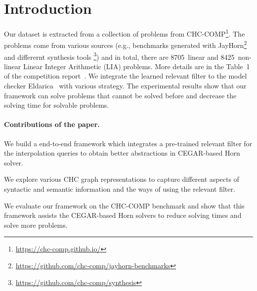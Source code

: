 
% 


\section{Introduction}




Our dataset is extracted from a collection of problems from CHC-COMP\footnote{\url{https://chc-comp.github.io/}}. The problems come from various sources (e.g., benchmarks generated with JayHorn\footnote{\url{https://github.com/chc-comp/jayhorn-benchmarks}} and differernt synthesis tools \footnote{\url{https://github.com/chc-comp/synthesis}}) and in total, there are 8705~linear and 8425~non-linear Linear Integer Arithmetic (LIA) problems. More details are in the Table~1 of the competition report~\cite{chcBenchmark}. We integrate the learned relevant filter to the model checker Eldarica~\cite{ruemmer2013disjunctive} with various strategy. The experimental results show that our framework can solve problems that cannot be solved before and decrease the solving time for solvable problems.


\paragraph{Contributions of the paper.}
\begin{inparaenum}[(i)]
  \item We build a end-to-end framework which integrates a pre-trained relevant filter for the interpolation queries to obtain better abstractions in CEGAR-based Horn solver.
  \item We explore various CHC graph representations to capture different aspects of syntactic and semantic information and the ways of using the relevant filter. 
  \item We evaluate our framework on the CHC-COMP benchmark and show that this framework assists the CEGAR-based Horn solvers to reduce solving times and solve more problems.
\end{inparaenum}

% 


